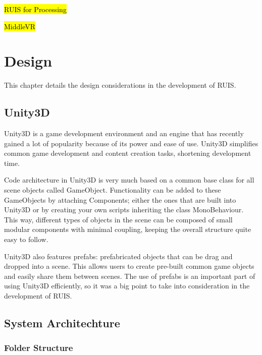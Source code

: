 \documentclass[12pt,a4paper,oneside,pdftex]{report}
\begin{document}
\hl{RUIS for Processing}

\hl{MiddleVR}




\chapter{Design}
\label{chapter:design}

This chapter details the design considerations in the development of RUIS.

\section{Unity3D}
\label{section:unity3d}

Unity3D \cite{UnitySite} is a game development environment and an engine that has recently gained a lot of popularity because of its power and ease of use. Unity3D simplifies common game development and content creation tasks, shortening development time.

Code architecture in Unity3D is very much based on a common base class for all scene objects called GameObject. Functionality can be added to these GameObjects by attaching Components; either the ones that are built into Unity3D or by creating your own scripts inheriting the class MonoBehaviour. This way, different types of objects in the scene can be composed of small modular components with minimal coupling, keeping the overall structure quite easy to follow.

Unity3D also features prefabs: prefabricated objects that can be drag and dropped into a scene. This allows users to create pre-built common game objects and easily share them between scenes. The use of prefabs is an important part of using Unity3D efficiently, so it was a big point to take into consideration in the development of RUIS. 

\section{System Architechture}
\label{section:systemarchitecture}

\subsection{Folder Structure}
\label{subsection:systemarchitecture:folderstructure}
\end{document}

